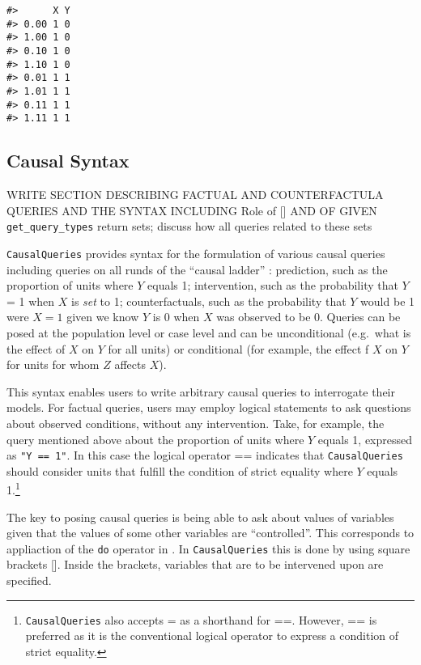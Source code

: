 \documentclass[
  11pt,
  article]{jss}
\begin{document}
\begin{verbatim}
#>      X Y
#> 0.00 1 0
#> 1.00 1 0
#> 0.10 1 0
#> 1.10 1 0
#> 0.01 1 1
#> 1.01 1 1
#> 0.11 1 1
#> 1.11 1 1
\end{verbatim}

\hypertarget{sec-syntax}{%
\subsection{Causal Syntax}\label{sec-syntax}}

WRITE SECTION DESCRIBING FACTUAL AND COUNTERFACTULA QUERIES AND THE
SYNTAX INCLUDING Role of {[}{]} AND OF GIVEN \texttt{get\_query\_types}
return sets; discuss how all queries related to these sets

\texttt{CausalQueries} provides syntax for the formulation of various
causal queries including queries on all runds of the ``causal ladder''
\citep{pearl2018book}: prediction, such as the proportion of units where
\(Y\) equals 1; intervention, such as the probability that \(Y\) = 1
when \(X\) is \emph{set} to 1; counterfactuals, such as the probability
that \(Y\) would be 1 were \(X=1\) given we know \(Y\) is 0 when \(X\)
was observed to be 0. Queries can be posed at the population level or
case level and can be unconditional (e.g.~what is the effect of \(X\) on
\(Y\) for all units) or conditional (for example, the effect f \(X\) on
\(Y\) for units for whom \(Z\) affects \(X\)).

This syntax enables users to write arbitrary causal queries to
interrogate their models. For factual queries, users may employ logical
statements to ask questions about observed conditions, without any
intervention. Take, for example, the query mentioned above about the
proportion of units where \(Y\) equals 1, expressed as
\texttt{"Y\ ==\ 1"}. In this case the logical operator == indicates that
\texttt{CausalQueries} should consider units that fulfill the condition
of strict equality where \(Y\) equals 1.\footnote{\texttt{CausalQueries}
  also accepts = as a shorthand for ==. However, == is preferred as it
  is the conventional logical operator to express a condition of strict
  equality.}

The key to posing causal queries is being able to ask about values of
variables given that the values of some other variables are
``controlled''. This corresponds to appliaction of the \texttt{do}
operator in \citet{pearl2009causality}. In \texttt{CausalQueries} this
is done by using square brackets {[}{]}. Inside the brackets, variables
that are to be intervened upon are specified.
\end{document}
